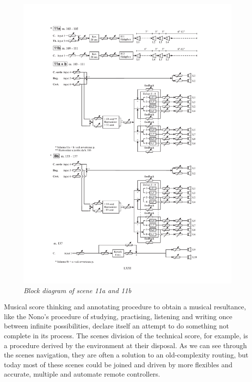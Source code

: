 \documentclass[twoside,a4paper]{article}
\begin{document}
\begin{figure}[ht]
\centerline{\includegraphics[width=.45\textwidth]{img/re-diagramma11}}
\caption{\label{re-dia-6c}{\it Block diagram of scene 11a and 11b}}
\end{figure}

Musical score thinking and annotating procedure to obtain a musical resultance, like the Nono's procedure of studying, practising, listening and writing once between infinite possibilities, declare itself an attempt to do something not complete in its process. The scenes division of the technical score, for example, is a procedure derived by the environment at their disposal. As we can see through the scenes navigation, they are often a solution to an old-complexity routing, but today most of these scenes could be joined and driven by more flexibles and accurate, multiple and automate remote controllers. 
\end{document}

